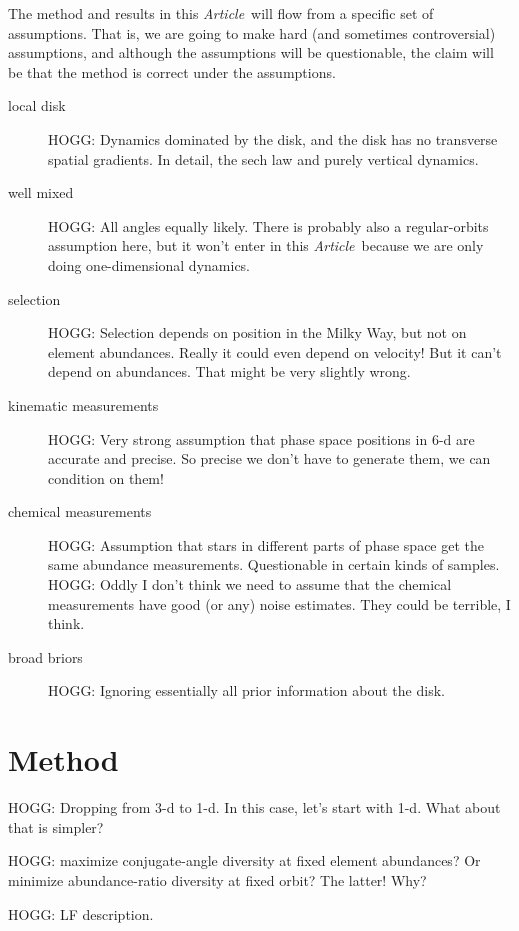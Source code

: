 \documentclass[modern]{aastex62}
\newcommand{\documentname}{\textsl{Article}}
\begin{document}
The method and results in this \documentname\ will flow from a specific set of
assumptions.
That is, we are going to make hard (and sometimes controversial) assumptions,
and although the assumptions will be questionable, the claim will be that the
method is correct under the assumptions.
\begin{description}
\item[local disk] HOGG: Dynamics dominated by the disk,
and the disk has no transverse spatial gradients. In detail, the sech law and purely
vertical dynamics.

\item[well mixed] HOGG: All angles equally likely. There is probably also a regular-orbits
assumption here, but it won't enter in this \documentname\ because we are only doing
one-dimensional dynamics.

\item[selection] HOGG: Selection depends on position in the Milky Way, but not
on element abundances. Really it could even depend on velocity! But it can't depend
on abundances. That might be very slightly wrong.

\item[kinematic measurements] HOGG: Very strong assumption that phase space positions
in 6-d are accurate and precise. So precise we don't have to generate them, we can
condition on them!

\item[chemical measurements] HOGG: Assumption that stars in different parts of phase
space get the same abundance measurements. Questionable in certain kinds of samples.
HOGG: Oddly I don't think we need to assume that the chemical measurements have good
(or any) noise estimates. They could be terrible, I think.

\item[broad briors] HOGG: Ignoring essentially all prior information about the disk.
\end{description}

\section{Method}

HOGG: Dropping from 3-d to 1-d. In this case, let's start with 1-d. What about that is simpler?

HOGG: maximize conjugate-angle diversity at fixed element abundances?
Or minimize abundance-ratio diversity at fixed orbit? The latter! Why?

HOGG: LF description.
\end{document}
